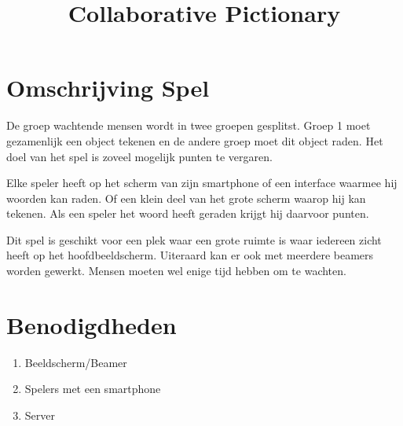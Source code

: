 \documentclass[a4paper, fleqn]{article}
\title{Collaborative Pictionary}
\begin{document}
\maketitle
\section{Omschrijving Spel}
De groep wachtende mensen wordt in twee groepen gesplitst. Groep 1 moet gezamenlijk een object tekenen en de andere groep moet dit object raden. Het doel van het spel is zoveel mogelijk punten te vergaren. 

Elke speler heeft op het scherm van zijn smartphone of een interface waarmee hij woorden kan raden. Of een klein deel van het grote scherm waarop hij kan tekenen. Als een speler het woord heeft geraden krijgt hij daarvoor punten. 

Dit spel is geschikt voor een plek waar een grote ruimte is waar iedereen zicht heeft op het hoofdbeeldscherm. Uiteraard kan er ook met meerdere beamers worden gewerkt. Mensen moeten wel enige tijd hebben om te wachten. 

\section{Benodigdheden}
\begin{enumerate}
\item Beeldscherm/Beamer
\item Spelers met een smartphone
\item Server
\end{enumerate}
\end{document}
